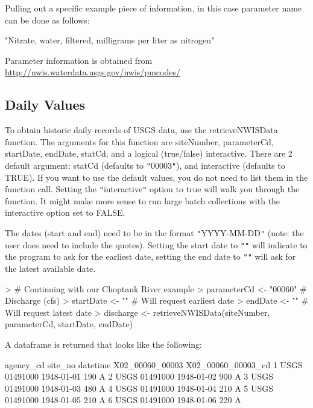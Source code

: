 \documentclass[a4paper,11pt]{article}
\begin{document}
Pulling out a specific example piece of information, in this case parameter name can be done as follows:
\begin{Schunk}
\begin{Soutput}
[1] "Nitrate, water, filtered, milligrams per liter as nitrogen"
\end{Soutput}
\end{Schunk}
Parameter information is obtained from \url{http://nwis.waterdata.usgs.gov/nwis/pmcodes/}
\FloatBarrier
\subsection{Daily Values}
\label{sec:usgsDaily}
To obtain historic daily records of USGS data, use the retrieveNWISData function. The arguments for this function are siteNumber, parameterCd, startDate, endDate, statCd, and a logical (true/false) interactive. There are 2 default argument: statCd (defaults to \texttt{"}00003\texttt{"}), and interactive (defaults to TRUE).  If you want to use the default values, you do not need to list them in the function call. Setting the \texttt{"}interactive\texttt{"} option to true will walk you through the function. It might make more sense to run large batch collections with the interactive option set to FALSE. 

The dates (start and end) need to be in the format \texttt{"}YYYY-MM-DD\texttt{"} (note: the user does need to include the quotes).  Setting the start date to \texttt{"}\texttt{"} will indicate to the program to ask for the earliest date, setting the end date to \texttt{"}\texttt{"} will ask for the latest available date.

\begin{Schunk}
\begin{Sinput}
> # Continuing with our Choptank River example
> parameterCd <- "00060"  # Discharge (cfs)
> startDate <- ""  # Will request earliest date
> endDate <- "" # Will request latest date
> discharge <- retrieveNWISData(siteNumber, parameterCd, startDate, endDate)
\end{Sinput}
\end{Schunk}

A dataframe is returned that looks like the following:
\begin{Schunk}
\begin{Soutput}
  agency_cd  site_no   datetime X02_00060_00003 X02_00060_00003_cd
1      USGS 01491000 1948-01-01             190                  A
2      USGS 01491000 1948-01-02             900                  A
3      USGS 01491000 1948-01-03             480                  A
4      USGS 01491000 1948-01-04             210                  A
5      USGS 01491000 1948-01-05             210                  A
6      USGS 01491000 1948-01-06             220                  A
\end{Soutput}
\end{Schunk}
\end{document}
